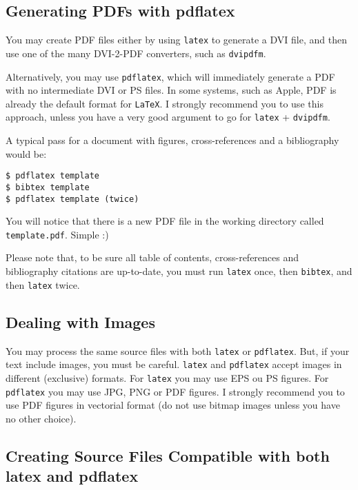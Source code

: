 \subsection{Generating PDFs with pdflatex} %
\label{ssec:generating_pdfs_with_pdflatex}

You may create PDF files either by using \verb!latex! to generate a DVI file, and then use one of the many DVI-2-PDF converters, such as \verb!dvipdfm!.

Alternatively, you may use \verb!pdflatex!, which will immediately generate a PDF with no intermediate DVI or PS files. In some systems, such as Apple, PDF is already the default format for \texttt{LaTeX}. I strongly recommend you to use this approach, unless you have a very good argument to go for \verb!latex! + \verb!dvipdfm!.

A typical pass for a document with figures, cross-references and a bibliography would be:
\begin{verbatim}
$ pdflatex template
$ bibtex template
$ pdflatex template (twice)
\end{verbatim}
\begin{sloppypar}
You will notice that there is a new PDF file in the working directory called \verb!template.pdf!. Simple :)
\end{sloppypar}


Please note that, to be sure all table of contents, cross-references and bibliography citations are up-to-date, you must run \verb!latex! once, then \verb!bibtex!, and then \verb!latex! twice.

\subsection{Dealing with Images} %
\label{sub:dealing_with_images}

You may process the same source files with both \verb!latex! or \verb!pdflatex!. But, if your text include images, you must be careful. \verb!latex! and \verb!pdflatex! accept images in different (exclusive) formats.  For \verb!latex! you may use EPS ou PS figures. For \verb!pdflatex! you may use JPG, PNG or PDF figures.  I strongly recommend you to use PDF figures in vectorial format (do not use bitmap images unless you have no other choice).


\subsection{Creating Source Files Compatible with both latex and pdflatex} %
\label{ssec:creating_source_files_compatible_with_both_latex_and_pdflatex}

